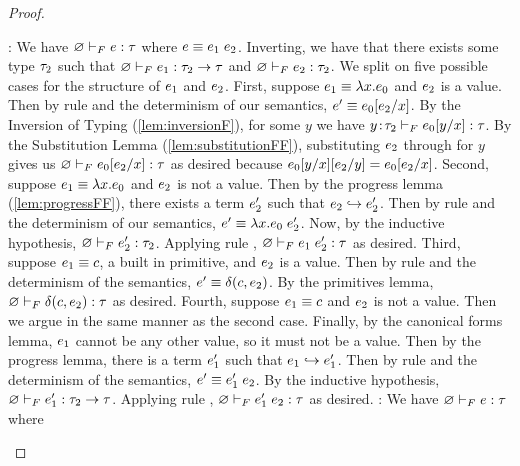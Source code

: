 \begin{proof}
  \begin{itemize}
  \pfcase{\fApp}: We have 
  $\hasftype{\varnothing}{\sexpr}{\sftype}$ where
  $\sexpr \equiv \app{\sexpr_1}{\sexpr_2}$. 
  Inverting, we have that there exists some type $\sftype_2$
  such that $\hasftype{\varnothing}{\sexpr_1}{\funcftype{\sftype_2}{\sftype}}$
  and $\hasftype{\varnothing}{\sexpr_2}{\sftype_2}$.
  We split on five possible cases for 
  the structure of $\sexpr_1$ and $\sexpr_2$. 
  First, suppose $\sexpr_1 \equiv \vabs{x}{\sexpr_0}$ and $\sexpr_2$ is 
  a value. Then by rule \eAppAbs and the determinism of our semantics, 
  $e' \equiv \subst{\sexpr_0}{x}{\sexpr_2}$.
  By the Inversion of Typing (\ref{lem:inversionF}), for some $y$ we have
  $\hasftype{\bind{y}{\sftype_2}}{\subst{\sexpr_0}{x}{y}}{\sftype}$.
  By the Substitution Lemma (\ref{lem:substitutionFF}), 
  substituting $\sexpr_2$ through for $y$
  gives us $\hasftype{\varnothing}{\subst{\sexpr_0}{x}{\sexpr_2}}{\sftype}$
  as desired because $\subst{\subst{\sexpr_0}{x}{y}}{y}{\sexpr_2} = \subst{\sexpr_0}{x}{\sexpr_2}$.
  Second, suppose $\sexpr_1 \equiv \vabs{x}{\sexpr_0}$ and $\sexpr_2$
  is not a value. Then by the progress lemma (\ref{lem:progressFF}), 
  there exists a term
  $\sexpr'_2$ such that $\sexpr_2 \step \sexpr'_2$. Then by rule \eAppV
  and the determinism of our semantics,
  $e' \equiv \app{\vabs{x}{\sexpr_0}}{\sexpr'_2}$. 
  Now, by the inductive hypothesis, 
  $\hasftype{\varnothing}{\sexpr'_2}{\sftype_2}$.
  Applying rule \fApp, 
  $\hasftype{\varnothing}{\app{\sexpr_1}{\sexpr'_2}}{\sftype}$
  as desired.
  Third, suppose $\sexpr_1 \equiv \sconst$, a built in primitive, 
  and $\sexpr_2$ is a value. Then by rule \ePrim
  and the determinism of the semantics, 
  $e' \equiv \delta(\sconst,\sexpr_2)$.
  By the primitives lemma, 
  $\hasftype{\varnothing}{\delta(\sconst,\sexpr_2)}{\sftype}$ as desired.
  Fourth, suppose $\sexpr_1 \equiv \sconst$ and $\sexpr_2$
  is not a value. Then we argue in the same manner as the second case.
  Finally, by the canonical forms lemma, $\sexpr_1$ cannot be any other
  value, so it must not be a value. Then by the progress lemma,
  there is a term $\sexpr'_1$ such that $\sexpr_1 \step \sexpr'_1$. 
  Then by rule \eApp and the determinism of the semantics,
  $e' \equiv \app{\sexpr'_1}{\sexpr_2}$. By the inductive hypothesis,
  $\hasftype{\varnothing}{\sexpr'_1}{\funcftype{\sftype_2}{\sftype}}$.
  Applying rule \fApp, $\hasftype{\varnothing}{\app{\sexpr'_1}{\sexpr_2}}{\sftype}$
  as desired.
  \pfcase{\fTApp}: We have 
  $\hasftype{\varnothing}{\sexpr}{\sftype}$ where

\end{itemize}
\end{proof}
